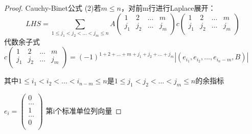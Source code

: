 \begin{proof}{Cauchy-Binet公式}{}
  (2)若$m\leq n$，对前m行进行Laplace展开：
  \[LHS=\sum_{1\leq j_1<j_2<\dots<j_m\leq n}
  A\begin{pmatrix}
    1 & 2 & \dots & m \\
    j_1 & j_2 & \dots & j_m \\
  \end{pmatrix}
  c\begin{pmatrix}
    1 & 2 & \dots & m \\
    j_1 & j_2 & \dots & j_m \\
  \end{pmatrix}
  \]
  代数余子式
  $c\begin{pmatrix}
    1 & 2 & \dots & m \\
    j_1 & j_2 & \dots & j_m \\
  \end{pmatrix}
  =(-1)^{1+2+\dots+m+j_1+j_2+\dots+j_m}|(e_{i_1},e_{i_2},\dots,e_{i_n-m},B)|$

  其中$1\leq i_1<i_2<\dots<i_{n-m}\leq n$是$1\leq j_1<j_2<\dots <j_m\leq n$的余指标

  $e_i=\begin{pmatrix}
    0 \\
    \dots\\
    1\\
    \dots\\
    0\\
  \end{pmatrix}$
  第i个标准单位列向量
\end{proof}